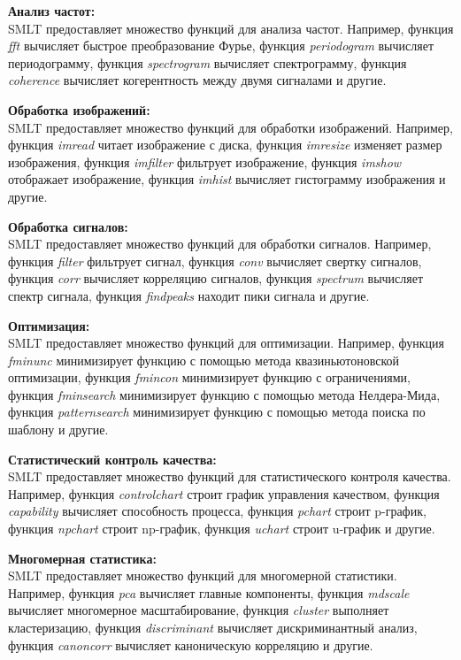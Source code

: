 \documentclass[a4paper, 12pt]{article}%
\begin{document}
\begin{titlepage}
	\textbf{Анализ частот:}\\
	SMLT предоставляет множество функций для анализа частот. Например, функция \textit{fft} вычисляет быстрое преобразование Фурье, функция \textit{periodogram} вычисляет периодограмму, функция \textit{spectrogram} вычисляет спектрограмму, функция \textit{coherence} вычисляет когерентность между двумя сигналами и другие.
	
	\textbf{Обработка изображений:}\\
	SMLT предоставляет множество функций для обработки изображений. Например, функция \textit{imread} читает изображение с диска, функция \textit{imresize} изменяет размер изображения, функция \textit{imfilter} фильтрует изображение, функция \textit{imshow} отображает изображение, функция \textit{imhist} вычисляет гистограмму изображения и другие.
	
	\textbf{Обработка сигналов:}\\
	SMLT предоставляет множество функций для обработки сигналов. Например, функция \textit{filter} фильтрует сигнал, функция \textit{conv} вычисляет свертку сигналов, функция \textit{corr} вычисляет корреляцию сигналов, функция \textit{spectrum} вычисляет спектр сигнала, функция \textit{findpeaks} находит пики сигнала и другие.
	
	\textbf{Оптимизация:}\\
	SMLT предоставляет множество функций для оптимизации. Например, функция \textit{fminunc} минимизирует функцию с помощью метода квазиньютоновской оптимизации, функция \textit{fmincon} минимизирует функцию с ограничениями, функция \textit{fminsearch} минимизирует функцию с помощью метода Нелдера-Мида, функция \textit{patternsearch} минимизирует функцию с помощью метода поиска по шаблону и другие.
	
	\textbf{Статистический контроль качества:}\\
	SMLT предоставляет множество функций для статистического контроля качества. Например, функция \textit{controlchart} строит график управления качеством, функция \textit{capability} вычисляет способность процесса, функция \textit{pchart} строит p-график, функция \textit{npchart} строит np-график, функция \textit{uchart} строит u-график и другие.
	
	\textbf{Многомерная статистика:}\\
	SMLT предоставляет множество функций для многомерной статистики. Например, функция \textit{pca} вычисляет главные компоненты, функция \textit{mdscale} вычисляет многомерное масштабирование, функция \textit{cluster} выполняет кластеризацию, функция \textit{discriminant} вычисляет дискриминантный анализ, функция \textit{canoncorr} вычисляет каноническую корреляцию и другие.
	

\end{titlepage}
\end{document}

